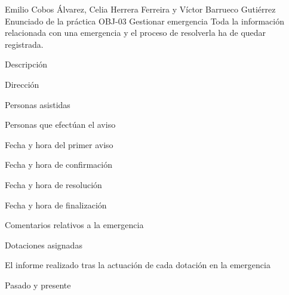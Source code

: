 {Emilio Cobos Álvarez, Celia Herrera Ferreira y Víctor Barrueco Gutiérrez}
{Enunciado de la práctica}
{OBJ-03 Gestionar emergencia}
{}%
{Toda la información relacionada con una emergencia y el proceso de resolverla ha de quedar registrada.}
{
\item{Descripción}
\item{Dirección}
\item{Personas asistidas}
\item{Personas que efectúan el aviso}
\item{Fecha y hora del primer aviso}
\item{Fecha y hora de confirmación}
\item{Fecha y hora de resolución}
\item{Fecha y hora de finalización}
\item{Comentarios relativos a la emergencia}
\item{Dotaciones asignadas}
\item{El informe realizado tras la actuación de cada dotación en la emergencia}
}
{Pasado y presente}


